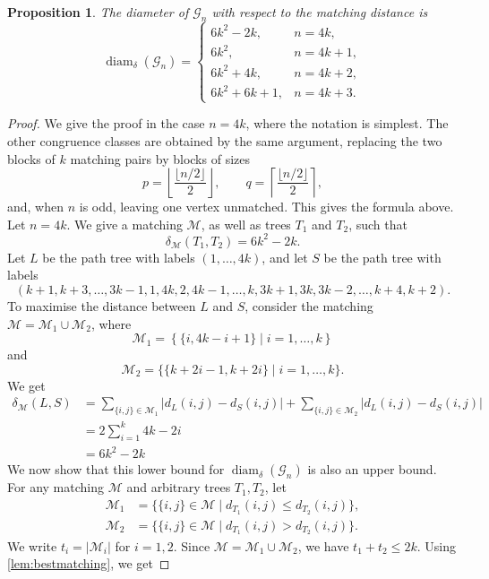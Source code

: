 \documentclass[reqno,dvipsnames]{amsart}
\theoremstyle{plain}
\newtheorem{proposition}[theorem]{Proposition}
\numberwithin{equation}{section}
\theoremstyle{definition}
\begin{document}
\begin{proposition}\label{prop:deltadiam}
	The diameter of $\mathcal{G}_n$ with respect to the matching distance is
	\[
	\operatorname{diam}_{\delta}(\mathcal{G}_n)=
	\begin{cases}
		6k^2-2k, & n=4k,\\
		6k^2, & n=4k+1,\\
		6k^2+4k, & n=4k+2,\\
		6k^2+6k+1, & n=4k+3.
	\end{cases}
	\]
\end{proposition}

\begin{proof}
	We give the proof in the case $n=4k$, where the notation is simplest. The other congruence classes are obtained by the same argument, replacing the two blocks of $k$ matching pairs by blocks of sizes
	\[
	p=\left\lfloor \frac{\lfloor n/2\rfloor}{2}\right\rfloor,
	\qquad
	q=\left\lceil \frac{\lfloor n/2\rfloor}{2}\right\rceil,
	\]
	and, when \(n\) is odd, leaving one vertex unmatched. This gives the formula above. Let $n = 4k$. We give a matching $\mathcal{M}$, as well as trees $T_1$ and $T_2$, such that 
	\[
	\delta_\mathcal{M}(T_1,T_2) = 6k^2-2k.
	\]
	Let $L$ be the path tree with labels $(1,\dots,4k)$, and let $S$ be the path tree with labels
	\[
	(k+1,k+3,\dots,3k-1,1,4k,2,4k-1,\dots,k,3k+1,3k,3k-2,\dots,k+4,k+2).
	\]
	To maximise the distance between $L$ and $S$, consider the matching $\mathcal{M} = \mathcal{M}_1\cup\mathcal{M}_2$, where 
	\[
	\mathcal{M}_1 = \left\{\{i,4k-i+1\} \mid i = 1,\dots,k\right\}
	\]
	and 
	\[
	\mathcal{M}_2 = \{\{k+2i-1,k+2i\} \mid i = 1,\dots,k\}.
	\]
	We get
	\begin{align*}
		\delta_\mathcal{M}(L,S) &= \sum_{\{i,j\}\in\mathcal{M}_1}|d_L(i,j)-d_S(i,j)| + \sum_{\{i,j\}\in\mathcal{M}_2}|d_L(i,j)-d_S(i,j)|\\
		&= 2\sum_{i = 1}^{k} 4k-2i \\
		&= 6k^2 - 2k 
	\end{align*}
	We now show that this lower bound for $\operatorname{diam}_\delta(\mathcal{G}_n)$ is also an upper bound. For any matching $\mathcal{M}$ and arbitrary trees $T_1,T_2$, let 
	\begin{align*}
		\mathcal{M}_1 &= \{\{i,j\}\in \mathcal{M} \mid d_{T_1}(i,j)\leq d_{T_2}(i,j)\},\\
		\mathcal{M}_2 &= \{\{i,j\}\in \mathcal{M} \mid d_{T_1}(i,j)> d_{T_2}(i,j)\}.
	\end{align*}
	We write $t_i = |\mathcal{M}_i|$ for $i = 1,2$. Since $\mathcal{M} = \mathcal{M}_1\cup\mathcal{M}_2$, we have $t_1 + t_2 \leq 2k$. Using \autoref{lem:bestmatching}, we get

\end{proof}
\end{document}
